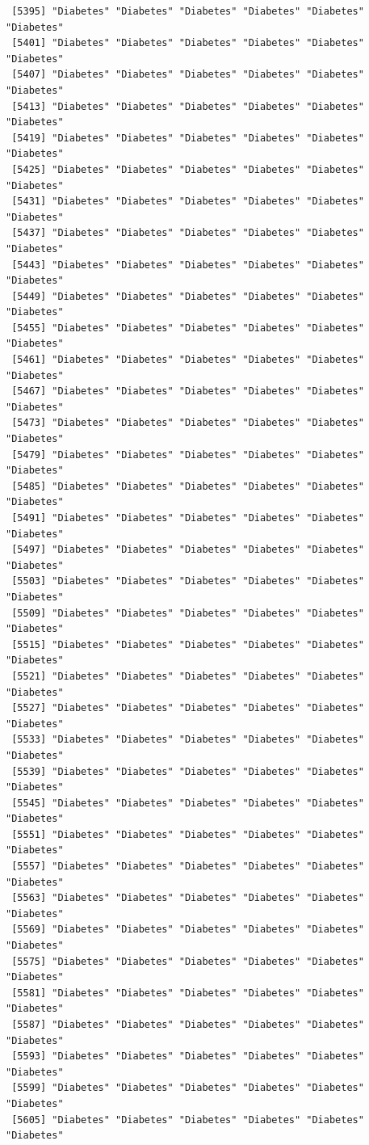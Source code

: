 \documentclass[
  letterpaper,
  DIV=11,
  numbers=noendperiod]{scrartcl}
\begin{document}
\begin{verbatim}
 [5395] "Diabetes" "Diabetes" "Diabetes" "Diabetes" "Diabetes" "Diabetes"
 [5401] "Diabetes" "Diabetes" "Diabetes" "Diabetes" "Diabetes" "Diabetes"
 [5407] "Diabetes" "Diabetes" "Diabetes" "Diabetes" "Diabetes" "Diabetes"
 [5413] "Diabetes" "Diabetes" "Diabetes" "Diabetes" "Diabetes" "Diabetes"
 [5419] "Diabetes" "Diabetes" "Diabetes" "Diabetes" "Diabetes" "Diabetes"
 [5425] "Diabetes" "Diabetes" "Diabetes" "Diabetes" "Diabetes" "Diabetes"
 [5431] "Diabetes" "Diabetes" "Diabetes" "Diabetes" "Diabetes" "Diabetes"
 [5437] "Diabetes" "Diabetes" "Diabetes" "Diabetes" "Diabetes" "Diabetes"
 [5443] "Diabetes" "Diabetes" "Diabetes" "Diabetes" "Diabetes" "Diabetes"
 [5449] "Diabetes" "Diabetes" "Diabetes" "Diabetes" "Diabetes" "Diabetes"
 [5455] "Diabetes" "Diabetes" "Diabetes" "Diabetes" "Diabetes" "Diabetes"
 [5461] "Diabetes" "Diabetes" "Diabetes" "Diabetes" "Diabetes" "Diabetes"
 [5467] "Diabetes" "Diabetes" "Diabetes" "Diabetes" "Diabetes" "Diabetes"
 [5473] "Diabetes" "Diabetes" "Diabetes" "Diabetes" "Diabetes" "Diabetes"
 [5479] "Diabetes" "Diabetes" "Diabetes" "Diabetes" "Diabetes" "Diabetes"
 [5485] "Diabetes" "Diabetes" "Diabetes" "Diabetes" "Diabetes" "Diabetes"
 [5491] "Diabetes" "Diabetes" "Diabetes" "Diabetes" "Diabetes" "Diabetes"
 [5497] "Diabetes" "Diabetes" "Diabetes" "Diabetes" "Diabetes" "Diabetes"
 [5503] "Diabetes" "Diabetes" "Diabetes" "Diabetes" "Diabetes" "Diabetes"
 [5509] "Diabetes" "Diabetes" "Diabetes" "Diabetes" "Diabetes" "Diabetes"
 [5515] "Diabetes" "Diabetes" "Diabetes" "Diabetes" "Diabetes" "Diabetes"
 [5521] "Diabetes" "Diabetes" "Diabetes" "Diabetes" "Diabetes" "Diabetes"
 [5527] "Diabetes" "Diabetes" "Diabetes" "Diabetes" "Diabetes" "Diabetes"
 [5533] "Diabetes" "Diabetes" "Diabetes" "Diabetes" "Diabetes" "Diabetes"
 [5539] "Diabetes" "Diabetes" "Diabetes" "Diabetes" "Diabetes" "Diabetes"
 [5545] "Diabetes" "Diabetes" "Diabetes" "Diabetes" "Diabetes" "Diabetes"
 [5551] "Diabetes" "Diabetes" "Diabetes" "Diabetes" "Diabetes" "Diabetes"
 [5557] "Diabetes" "Diabetes" "Diabetes" "Diabetes" "Diabetes" "Diabetes"
 [5563] "Diabetes" "Diabetes" "Diabetes" "Diabetes" "Diabetes" "Diabetes"
 [5569] "Diabetes" "Diabetes" "Diabetes" "Diabetes" "Diabetes" "Diabetes"
 [5575] "Diabetes" "Diabetes" "Diabetes" "Diabetes" "Diabetes" "Diabetes"
 [5581] "Diabetes" "Diabetes" "Diabetes" "Diabetes" "Diabetes" "Diabetes"
 [5587] "Diabetes" "Diabetes" "Diabetes" "Diabetes" "Diabetes" "Diabetes"
 [5593] "Diabetes" "Diabetes" "Diabetes" "Diabetes" "Diabetes" "Diabetes"
 [5599] "Diabetes" "Diabetes" "Diabetes" "Diabetes" "Diabetes" "Diabetes"
 [5605] "Diabetes" "Diabetes" "Diabetes" "Diabetes" "Diabetes" "Diabetes"

\end{verbatim}
\end{document}
